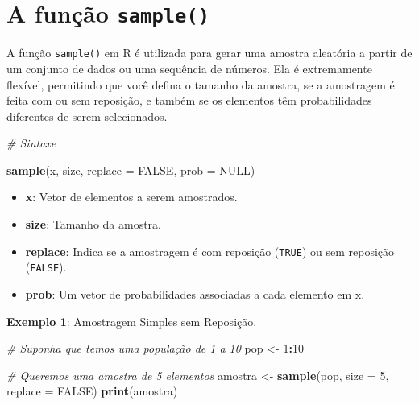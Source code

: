 \documentclass[
]{book}
\newenvironment{Shaded}{\begin{snugshade}}{\end{snugshade}}
\newcommand{\AttributeTok}[1]{\textcolor[rgb]{0.13,0.29,0.53}{#1}}
\newcommand{\CommentTok}[1]{\textcolor[rgb]{0.56,0.35,0.01}{\textit{#1}}}
\newcommand{\ConstantTok}[1]{\textcolor[rgb]{0.56,0.35,0.01}{#1}}
\newcommand{\DecValTok}[1]{\textcolor[rgb]{0.00,0.00,0.81}{#1}}
\newcommand{\FunctionTok}[1]{\textcolor[rgb]{0.13,0.29,0.53}{\textbf{#1}}}
\newcommand{\NormalTok}[1]{#1}
\newcommand{\OtherTok}[1]{\textcolor[rgb]{0.56,0.35,0.01}{#1}}
\newcommand{\SpecialCharTok}[1]{\textcolor[rgb]{0.81,0.36,0.00}{\textbf{#1}}}
\begin{document}
\section{\texorpdfstring{A função \texttt{sample()}}{A função sample()}}\label{a-funuxe7uxe3o-sample}

A função \texttt{sample()} em R é utilizada para gerar uma amostra aleatória a partir de um conjunto de dados ou uma sequência de números. Ela é extremamente flexível, permitindo que você defina o tamanho da amostra, se a amostragem é feita com ou sem reposição, e também se os elementos têm probabilidades diferentes de serem selecionados.

\begin{Shaded}
\begin{Highlighting}[]
\CommentTok{\# Sintaxe}

\FunctionTok{sample}\NormalTok{(x, size, }\AttributeTok{replace =} \ConstantTok{FALSE}\NormalTok{, }\AttributeTok{prob =} \ConstantTok{NULL}\NormalTok{)}
\end{Highlighting}
\end{Shaded}

\begin{itemize}
\item
  \textbf{x}: Vetor de elementos a serem amostrados.
\item
  \textbf{size}: Tamanho da amostra.
\item
  \textbf{replace}: Indica se a amostragem é com reposição (\texttt{TRUE}) ou sem reposição (\texttt{FALSE}).
\item
  \textbf{prob}: Um vetor de probabilidades associadas a cada elemento em x.
\end{itemize}

\textbf{Exemplo 1}: Amostragem Simples sem Reposição.

\begin{Shaded}
\begin{Highlighting}[]
\CommentTok{\# Suponha que temos uma população de 1 a 10}
\NormalTok{pop }\OtherTok{\textless{}{-}} \DecValTok{1}\SpecialCharTok{:}\DecValTok{10}

\CommentTok{\# Queremos uma amostra de 5 elementos}
\NormalTok{amostra }\OtherTok{\textless{}{-}} \FunctionTok{sample}\NormalTok{(pop, }\AttributeTok{size =} \DecValTok{5}\NormalTok{, }\AttributeTok{replace =} \ConstantTok{FALSE}\NormalTok{)}
\FunctionTok{print}\NormalTok{(amostra)}
\end{Highlighting}
\end{Shaded}
\end{document}
